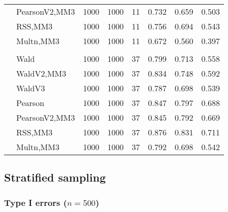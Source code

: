 \documentclass[
]{article}
\begin{document}
\begin{table}[H]
{\begin{tabular}[t]{llrrrrrr}
\hspace{1em} & PearsonV2,MM3 & 1000 & 1000 & 11 & 0.732 & 0.659 & 0.503\\

\hspace{1em} & RSS,MM3 & 1000 & 1000 & 11 & 0.756 & 0.694 & 0.543\\

\hspace{1em} & Multn,MM3 & 1000 & 1000 & 11 & 0.672 & 0.560 & 0.397\\
\cmidrule{1-8}
\addlinespace[0.3em]
\multicolumn{8}{l}{\textbf{3F 15V}}\\
\hspace{1em} & Wald & 1000 & 1000 & 37 & 0.799 & 0.713 & 0.558\\

\hspace{1em} & WaldV2,MM3 & 1000 & 1000 & 37 & 0.834 & 0.748 & 0.592\\

\hspace{1em} & WaldV3 & 1000 & 1000 & 37 & 0.787 & 0.698 & 0.539\\

\hspace{1em} & Pearson & 1000 & 1000 & 37 & 0.847 & 0.797 & 0.688\\

\hspace{1em} & PearsonV2,MM3 & 1000 & 1000 & 37 & 0.845 & 0.792 & 0.669\\

\hspace{1em} & RSS,MM3 & 1000 & 1000 & 37 & 0.876 & 0.831 & 0.711\\

\hspace{1em} & Multn,MM3 & 1000 & 1000 & 37 & 0.792 & 0.698 & 0.542\\
\bottomrule
\end{tabular}}
\end{table}

\hypertarget{stratified-sampling}{%
\subsection{Stratified sampling}\label{stratified-sampling}}

\hypertarget{type-i-errors-n500-1}{%
\subsubsection{\texorpdfstring{Type I errors
(\(n=500\))}{Type I errors (n=500)}}\label{type-i-errors-n500-1}}
\end{document}
